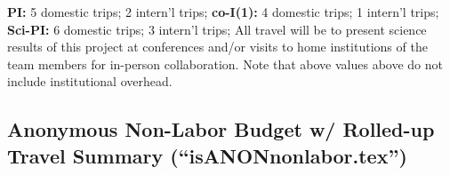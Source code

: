 \documentclass[usenames,dvipsnames,modern]{CLASS_FILES/aastex631}
\begin{document}
\begin{table}[h!]
{     \smallIndent \textbf{PI:} 5 domestic trips; 2 intern'l trips;\newline
     \smallIndent \textbf{co-I(1):} 4 domestic trips; 1 intern'l trips;\newline
     \smallIndent \textbf{Sci-PI:} 6 domestic trips; 3 intern'l trips;\newline
     \newline
     All travel will be to present science results of this project at conferences and/or visits to home institutions of the team members for in-person collaboration. Note that above values above do not include institutional overhead.}
  \label{tab:isANONtravel}
\end{table}

\newpage
\subsection{\textbf{Anonymous} Non-Labor Budget w/ Rolled-up Travel Summary (``isANONnonlabor.tex'')}
\end{document}
